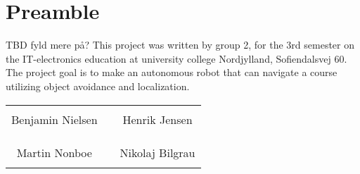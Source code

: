 \chapter*{Preamble}



TBD fyld mere på? 
This project was written by group 2, for the 3rd semester on the IT-electronics education at university college Nordjylland, Sofiendalsvej 60. The project goal is to make an autonomous robot that can navigate a course utilizing object avoidance and localization.
%
\phantom{Luft}\vspace{3cm}
\begin{table}[H]
	\centering
		\begin{tabular}{c c c}
			\underline{\phantom{JAERJAERJAERJAERGO}} & \phantom{cookies} & \underline{\phantom{JAERJAERJAERJAERGO}} \\
			Benjamin Nielsen			& \phantom{cookies} & Henrik Jensen		\\
			&&\\
			&&\\
			\underline{\phantom{JAERJAERJAERJAERGO}} & \phantom{cookies} & \underline{\phantom{JAERJAERJAERJAERGO}} \\
			Martin Nonboe			& \phantom{cookies} & Nikolaj Bilgrau		\\
			&&\\
						
		\end{tabular}
\end{table}